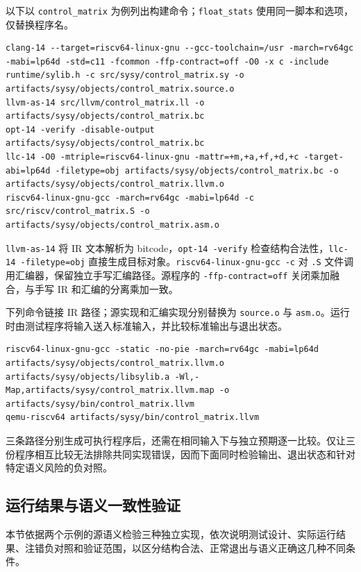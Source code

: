 以下以 \texttt{control\_matrix} 为例列出构建命令；\texttt{float\_stats} 使用同一脚本和选项，仅替换程序名。
\begin{lstlisting}[caption={源程序、手写 IR 与手写汇编分别生成目标文件},label={lst:sysy-object-build}]
clang-14 --target=riscv64-linux-gnu --gcc-toolchain=/usr -march=rv64gc -mabi=lp64d -std=c11 -fcommon -ffp-contract=off -O0 -x c -include runtime/sylib.h -c src/sysy/control_matrix.sy -o artifacts/sysy/objects/control_matrix.source.o
llvm-as-14 src/llvm/control_matrix.ll -o artifacts/sysy/objects/control_matrix.bc
opt-14 -verify -disable-output artifacts/sysy/objects/control_matrix.bc
llc-14 -O0 -mtriple=riscv64-linux-gnu -mattr=+m,+a,+f,+d,+c -target-abi=lp64d -filetype=obj artifacts/sysy/objects/control_matrix.bc -o artifacts/sysy/objects/control_matrix.llvm.o
riscv64-linux-gnu-gcc -march=rv64gc -mabi=lp64d -c src/riscv/control_matrix.S -o artifacts/sysy/objects/control_matrix.asm.o
\end{lstlisting}
\texttt{llvm-as-14} 将 IR 文本解析为 bitcode，\texttt{opt-14 -verify} 检查结构合法性，\texttt{llc-14 -filetype=obj} 直接生成目标对象。\texttt{riscv64-linux-gnu-gcc -c} 对 \texttt{.S} 文件调用汇编器，保留独立手写汇编路径。源程序的 \texttt{-ffp-contract=off} 关闭乘加融合，与手写 IR 和汇编的分离乘加一致。

\noindent\begin{minipage}{\linewidth}
下列命令链接 IR 路径；源实现和汇编实现分别替换为 \texttt{source.o} 与 \texttt{asm.o}。运行时由测试程序将输入送入标准输入，并比较标准输出与退出状态。
\begin{lstlisting}[caption={IR 路径的静态链接与执行工具},label={lst:sysy-link-run}]
riscv64-linux-gnu-gcc -static -no-pie -march=rv64gc -mabi=lp64d artifacts/sysy/objects/control_matrix.llvm.o artifacts/sysy/objects/libsylib.a -Wl,-Map,artifacts/sysy/control_matrix.llvm.map -o artifacts/sysy/bin/control_matrix.llvm
qemu-riscv64 artifacts/sysy/bin/control_matrix.llvm
\end{lstlisting}
\end{minipage}

三条路径分别生成可执行程序后，还需在相同输入下与独立预期逐一比较。仅让三份程序相互比较无法排除共同实现错误，因而下面同时检验输出、退出状态和针对特定语义风险的负对照。

\subsection{运行结果与语义一致性验证}
\label{sec:sysy-results}
本节依据两个示例的源语义检验三种独立实现，依次说明测试设计、实际运行结果、注错负对照和验证范围，以区分结构合法、正常退出与语义正确这几种不同条件。

